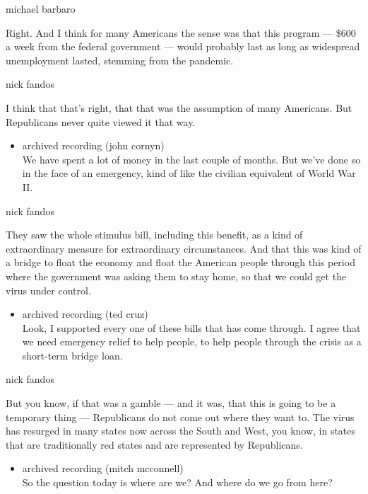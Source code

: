 michael barbaro

Right. And I think for many Americans the sense was that this program
--- \$600 a week from the federal government --- would probably last as
long as widespread unemployment lasted, stemming from the pandemic.

nick fandos

I think that that's right, that that was the assumption of many
Americans. But Republicans never quite viewed it that way.

\begin{itemize}
\tightlist
\item
  archived recording (john cornyn)\\
  We have spent a lot of money in the last couple of months. But we've
  done so in the face of an emergency, kind of like the civilian
  equivalent of World War II.
\end{itemize}

nick fandos

They saw the whole stimulus bill, including this benefit, as a kind of
extraordinary measure for extraordinary circumstances. And that this was
kind of a bridge to float the economy and float the American people
through this period where the government was asking them to stay home,
so that we could get the virus under control.

\begin{itemize}
\tightlist
\item
  archived recording (ted cruz)\\
  Look, I supported every one of these bills that has come through. I
  agree that we need emergency relief to help people, to help people
  through the crisis as a short-term bridge loan.
\end{itemize}

nick fandos

But you know, if that was a gamble --- and it was, that this is going to
be a temporary thing --- Republicans do not come out where they want to.
The virus has resurged in many states now across the South and West, you
know, in states that are traditionally red states and are represented by
Republicans.

\begin{itemize}
\tightlist
\item
  archived recording (mitch mcconnell)\\
  So the question today is where are we? And where do we go from here?
\end{itemize}

